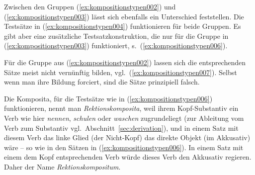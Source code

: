 \begin{exe}
  \ex\label{ex:kompositionstypen005}
  \begin{xlist}
  \end{xlist}
\end{exe}

Zwischen den Gruppen (\ref{ex:kompositionstypen002}) und (\ref{ex:kompositionstypen003}) lässt sich ebenfalls ein Unterschied feststellen.
Die Testsätze in (\ref{ex:kompositionstypen004}) funktionieren für beide Gruppen.
Es gibt aber eine zusätzliche Testsatzkonstruktion, die nur für die Gruppe in (\ref{ex:kompositionstypen003}) funktioniert, s.\ (\ref{ex:kompositionstypen006}).

\begin{exe}
  \ex\label{ex:kompositionstypen006}
  \begin{xlist}
  \end{xlist}
\end{exe}

Für die Gruppe aus (\ref{ex:kompositionstypen002}) lassen sich die entsprechenden Sätze meist nicht vernünftig bilden, vgl.\ (\ref{ex:kompositionstypen007}).
Selbst wenn man ihre Bildung forciert, sind die Sätze prinzipiell falsch.

\begin{exe}
  \ex\label{ex:kompositionstypen007}
  \begin{xlist}
  \end{xlist}
\end{exe}

Die Komposita, für die Testsätze wie in (\ref{ex:kompositionstypen006}) funktionieren, nennt man \textit{Rektionskomposita}, weil ihrem Kopf-Substantiv ein Verb wie hier \textit{nennen}, \textit{schulen} oder \textit{waschen} zugrundeliegt (zur Ableitung vom Verb zum Substantiv vgl.\ Abschnitt~\ref{sec:derivation}), und in einem Satz mit diesem Verb das linke Glied (der Nicht-Kopf) das direkte Objekt (im Akkusativ) wäre -- so wie in den Sätzen in (\ref{ex:kompositionstypen006}).
In einem Satz mit einem dem Kopf entsprechenden Verb würde dieses Verb den Akkusativ regieren.
Daher der Name \textit{Rektionskompositum}.

